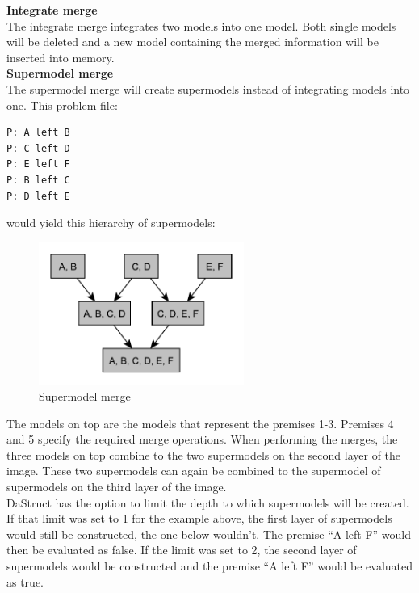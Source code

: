 \documentclass[hidelinks]{scrartcl}
\begin{document}
\textbf{Integrate merge} \\
The integrate merge integrates two models into one model. Both single models will be deleted and a new model containing the merged information will be inserted into memory. \\

\textbf{Supermodel merge} \\
The supermodel merge will create supermodels instead of integrating models into one. This problem file:

\begin{lstlisting}[caption=Problem files for merges, label=pf_merging, frame=single]
P: A left B
P: C left D
P: E left F
P: B left C
P: D left E
\end{lstlisting}

would yield this hierarchy of supermodels:

\begin{figure}[H]
	\caption{Supermodel merge}
	\label{img:supermodel_merge}
	\centering
	\includegraphics[width=0.6\textwidth]{Illustrations/supermodel_merge.pdf}
\end{figure}

The models on top are the models that represent the \gls{premise}s 1-3. Premises 4 and 5 specify the required merge operations. When performing the merges, the three models on top combine to the two supermodels on the second layer of the image. These two supermodels can again be combined to the supermodel of supermodels on the third layer of the image. \\
DaStruct has the option to limit the depth to which supermodels will be created. If that limit was set to 1 for the example above, the first layer of supermodels would still be constructed, the one below wouldn't. The \gls{premise} ``A left F'' would then be evaluated as false. If the limit was set to 2, the second layer of supermodels would be constructed and the \gls{premise} ``A left F'' would be evaluated as true.
\end{document}
